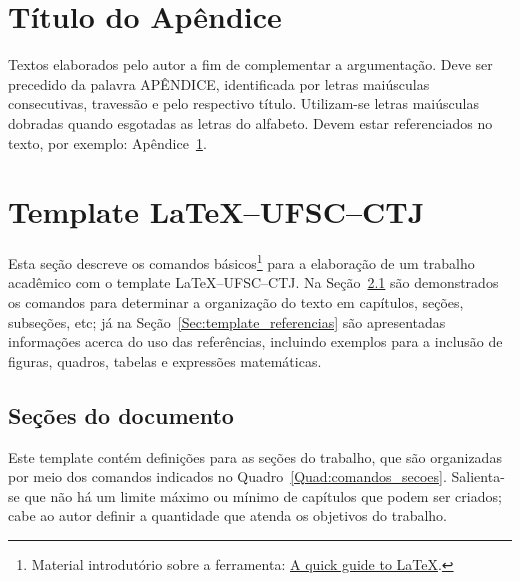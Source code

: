 \documentclass[
	12pt,				%
	oneside,			%
	a4paper,			%
	chapter=TITLE,		%
	section=TITLE,		%
	english,			%
	brazil,				%
	]{abntex2}
\begin{document}
\begin{apendicesenv}

    \chapter{Título do Apêndice}
    \label{Sec:exemplo_app}

    Textos elaborados pelo autor a fim de complementar a argumentação.
    Deve ser precedido da palavra APÊNDICE, identificada por letras maiúsculas consecutivas, travessão e pelo respectivo título.
    Utilizam-se letras maiúsculas dobradas quando esgotadas as letras do alfabeto.
    Devem estar referenciados no texto, por exemplo: Apêndice~\ref{Sec:exemplo_app}.

    \chapter{Template \LaTeX--UFSC--CTJ}

    Esta seção descreve os comandos básicos\footnote{Material introdutório sobre a ferramenta: \href{https://www.overleaf.com/latex/templates/a-quick-guide-to-latex/fghqpfgnxggz}{A quick guide to \LaTeX}.} para a elaboração de um trabalho acadêmico com o template \LaTeX--UFSC--CTJ.
    Na Seção~\ref{Sec:template_secoes} são demonstrados os comandos para determinar a organização do texto em capítulos, seções, subseções, etc; já na Seção~\ref{Sec:template_referencias} são apresentadas informações acerca do uso das referências, incluindo exemplos para a inclusão de figuras, quadros, tabelas e expressões matemáticas.

    \section{Seções do documento}
    \label{Sec:template_secoes}

    Este template contém definições para as seções do trabalho, que são organizadas por meio dos comandos indicados no Quadro~\ref{Quad:comandos_secoes}.
    Salienta-se que não há um limite máximo ou mínimo de capítulos que podem ser criados; cabe ao autor definir a quantidade que atenda os objetivos do trabalho.


\end{apendicesenv}
\end{document}
